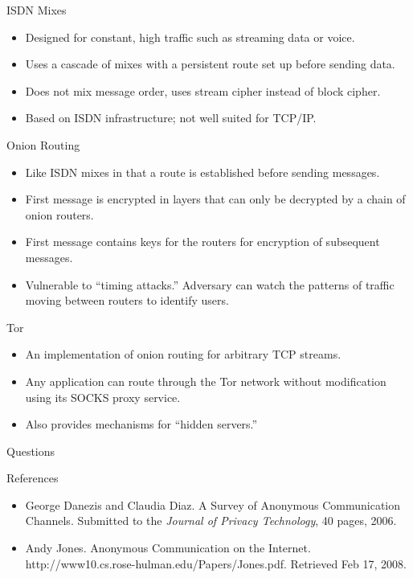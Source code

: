 \documentclass[default,pdf,colorBG,slideColor]{prosper}
\begin{document}
\begin{slide}{ISDN Mixes}
\begin{itemize}
\item Designed for constant, high traffic such as streaming data or voice.
\item Uses a cascade of mixes with a persistent route set up before sending data.
\item Does not mix message order, uses stream cipher instead of block cipher.
\item Based on ISDN infrastructure; not well suited for TCP/IP.
\end{itemize}
\end{slide}

\begin{slide}{Onion Routing}
\begin{itemize}
\item Like ISDN mixes in that a route is established before sending messages.
\item First message is encrypted in layers that can only be decrypted by a chain of onion routers.
\item First message contains keys for the routers for encryption of subsequent messages.
\item Vulnerable to ``timing attacks.''  Adversary can watch the patterns of traffic moving between routers to identify users.
\end{itemize}
\end{slide}

\begin{slide}{Tor}
\begin{itemize}
\item An implementation of onion routing for arbitrary TCP streams.
\item Any application can route through the Tor network without modification using its SOCKS proxy service.
\item Also provides mechanisms for ``hidden servers.'' 
\end{itemize}
\end{slide}

\begin{slide}{Questions}

\end{slide}

\begin{slide}{References}
\begin{itemize}
\item George Danezis and Claudia Diaz. A Survey of Anonymous Communication Channels. Submitted to the \emph{Journal of Privacy Technology}, 40 pages, 2006.

\item Andy Jones. Anonymous Communication on the Internet. http://www10.cs.rose-hulman.edu/Papers/Jones.pdf. Retrieved Feb 17, 2008.
\end{itemize}
\end{slide}
\end{document}
